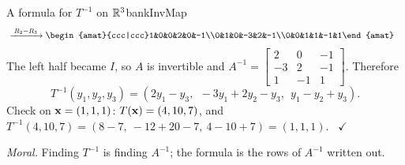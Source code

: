 \documentclass[11pt]{article}
\begin{document}
\begin{exmp}{A formula for $T^{-1}$ on $\mathbb{R}^3$}{bankInvMap}
\begin{align*}
&\rops{R_2-R_3}
\begin{amat}{ccc|ccc}1&0&0&2&0&-1\\0&1&0&-3&2&-1\\0&0&1&1&-1&1\end{amat}
\end{align*}
The left half became $I$, so $A$ is invertible and $A^{-1}=\begin{bmatrix}2&0&-1\\-3&2&-1\\1&-1&1\end{bmatrix}$. Therefore
\[
T^{-1}(y_1,y_2,y_3)=(2y_1-y_3,\ \ -3y_1+2y_2-y_3,\ \ y_1-y_2+y_3).
\]
Check on $\mathbf{x}=(1,1,1)$: $T(\mathbf{x})=(4,10,7)$, and $T^{-1}(4,10,7)=(8-7,\ -12+20-7,\ 4-10+7)=(1,1,1)$. \ $\checkmark$

\emph{Moral.} Finding $T^{-1}$ is finding $A^{-1}$; the formula is the rows of $A^{-1}$ written out.
\end{exmp}
\end{document}

